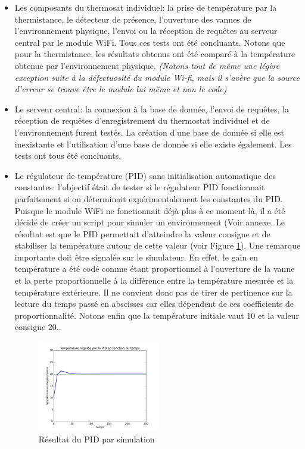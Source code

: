 \documentclass[11pt,a4paper,11pt]{report}
\begin{document}
\begin{itemize}[noitemsep]
\item Les composants du thermosat individuel: la prise de température par la thermistance, le détecteur de présence, l'ouverture des vannes de l'environnement physique, l'envoi ou la réception de requêtes au serveur central par le module WiFi. Tous ces tests ont été concluants. Notons que pour la thermistance, les résultats obtenus ont été comparé à la température obtenue par l'environnement physique. \textit{(Notons tout de même une légère exception suite à la défectuosité du module Wi-fi, mais il s'avère que la source d'erreur se trouve être le module lui même et non le code)}\\

\item Le serveur central: la connexion à la base de donnée, l'envoi de requêtes, la réception de requêtes d'enregistrement du thermostat individuel et de l'environnement furent testés. La création d'une base de donnée si elle est inexistante et l'utilisation d'une base de donnée si elle existe également. Les tests ont tous été concluants.\\


\item Le régulateur de température (PID) sans initialisation automatique des constantes: l'objectif était de tester si le régulateur PID fonctionnait parfaitement si on déterminait expérimentalement les constantes du PID. Puisque le module WiFi ne fonctionnait déjà plus à ce moment là, il a été décidé de créer un script pour simuler un environnement (Voir annexe. Le résultat est que le PID permettait d'atteindre la valeur consigne et de stabiliser la température autour de cette valeur (voir Figure \ref{PID}). Une remarque importante doit être signalée sur le simulateur. En effet, le gain en température a été codé comme étant proportionnel à l'ouverture de la vanne et la perte proportionnelle à la différence entre la température mesurée et la température extérieure. Il ne convient donc pas de tirer de pertinence sur la lecture du temps passé en abscisses car elles dépendent de ces coefficients de proportionnalité. Notons enfin que la température initiale vaut 10 et la valeur consigne 20..\\

\begin{figure}[h]
\centering
\includegraphics[width=0.5\textwidth]{images/pidSimul.jpg}
\caption{Résultat du PID par simulation}
\label{PID}
\end{figure}


\end{itemize}
\end{document}
